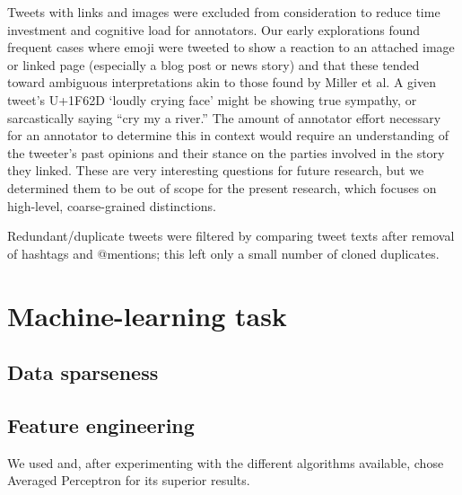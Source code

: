 \documentclass[11pt]{article}
\begin{document}
Tweets with links and images were excluded from consideration to reduce time investment and cognitive load for annotators. Our early explorations found frequent cases where emoji were tweeted to show a reaction to an attached image or linked page (especially a blog post or news story) and that these tended toward ambiguous interpretations akin to those found by Miller et al. A given tweet's U+1F62D `loudly crying face' might be showing true sympathy, or sarcastically saying ``cry my a river.'' The amount of annotator effort necessary for an annotator to determine this in context would require an understanding of the tweeter's past opinions and their stance on the parties involved in the story they linked. These are very interesting questions for future research, but we determined them to be out of scope for the present research, which focuses on high-level, coarse-grained distinctions.

Redundant/duplicate tweets were filtered by comparing tweet texts after removal of hashtags and @mentions; this left only a small number of cloned duplicates.

\section{Machine-learning task}

\subsection{Data sparseness}

\subsection{Feature engineering}

We used \cite{CRFSuite} and, after experimenting with the different algorithms available,
chose Averaged Perceptron \cite{AvePerceptron} for its superior results.




\end{document}
